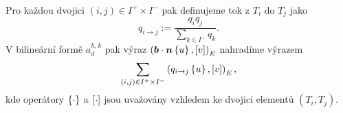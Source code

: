 Pro každou dvojici $(i,j)\in I^+\times I^-$ pak definujeme tok z $T_i$ do $T_j$ jako
$$ q_{i\to j} := \frac{q_i q_j}{\sum_{k\in I^-}{q_k}}. $$
V bilineární formě $a_d^{h,k}$ pak výraz $\left(\mathbf{\boldsymbol{b}}\cdot\mathbf{\boldsymbol{n}}\left\{u\right\},[v]\right)_E$ nahradíme výrazem
$$ \sum_{(i,j)\in I^+\times I^-}\left(q_{i\to j}\left\{u\right\},[v]\right)_E, $$
kde operátory $\left\{\cdot\right\}$ a $[\cdot]$ jsou uvažovány vzhledem ke dvojici elementů $(T_i,T_j)$.

